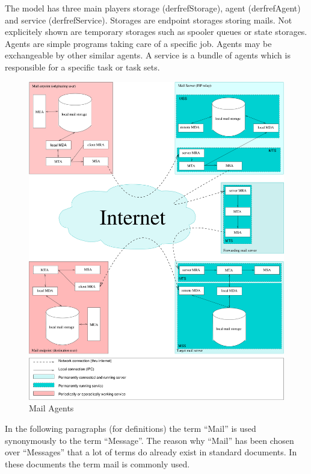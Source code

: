 The model has three main players storage (derfref{Storage}), agent (derfref{Agent}) and service (derfref{Service}). Storages are endpoint storages storing mails. Not explicitely shown are temporary storages such as spooler queues or state storages. Agents are simple programs taking care of a specific job. Agents may be exchangeable by other similar agents. A service is a bundle of agents which is responsible for a specific task or task sets.

\begin{figure}[ht!]
  \centering\includegraphics[width=\textwidth]{inc/MailAgents1}
  \caption{Mail Agents}\label{fig:MailAgents}
\end{figure}

In the following paragraphs (for definitions) the term ``Mail'' is used synonymously to the term ``Message''. The reason why ``Mail'' has been chosen over ``Messages'' that a lot of terms do already exist in standard documents. In these documents the term mail is commonly used.\par

